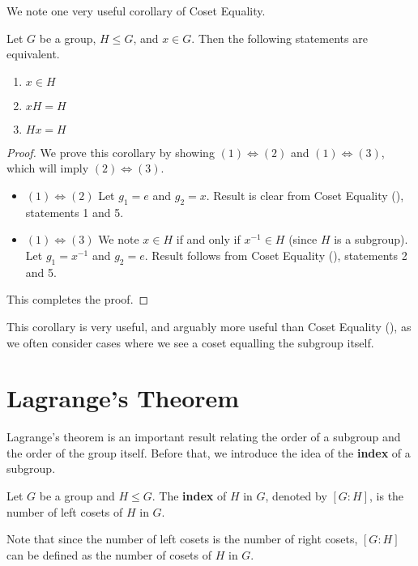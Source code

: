 We note one very useful corollary of Coset Equality.
\begin{corollary}\label{corollary-equivalence-of-element-in-coset}
    Let $G$ be a group, $H \leq G$, and $x \in G$. Then the following statements are equivalent.
    \begin{enumerate}[label=(\arabic*)]
        \item $x \in H$
        \item $xH = H$
        \item $Hx = H$
    \end{enumerate}
\end{corollary}
\begin{proof}
    We prove this corollary by showing $(1) \iff (2)$ and $(1) \iff (3)$, which will imply $(2) \iff (3)$.
    \begin{itemize}
        \item $\boxed{(1) \iff (2)}$ Let $g_1 = e$ and $g_2 = x$. Result is clear from Coset Equality (), statements 1 and 5.
        \item $\boxed{(1) \iff (3)}$ We note $x \in H$ if and only if $x^{-1} \in H$ (since $H$ is a subgroup). Let $g_1 = x^{-1}$ and $g_2 = e$. Result follows from Coset Equality (), statements 2 and 5.
    \end{itemize}
    This completes the proof.
\end{proof}
\begin{remark}
    This corollary is very useful, and arguably more useful than Coset Equality (), as we often consider cases where we see a coset equalling the subgroup itself.
\end{remark}

\section{Lagrange's Theorem}
Lagrange's theorem is an important result relating the order of a subgroup and the order of the group itself. Before that, we introduce the idea of the \textbf{index} of a subgroup.
\begin{definition}
    Let $G$ be a group and $H \leq G$. The \textbf{index} of $H$ in $G$, denoted by $[G : H]$, is the number of left cosets of $H$ in $G$.
\end{definition}
Note that since the number of left cosets is the number of right cosets, $[G : H]$ can be defined as the number of cosets of $H$ in $G$.

